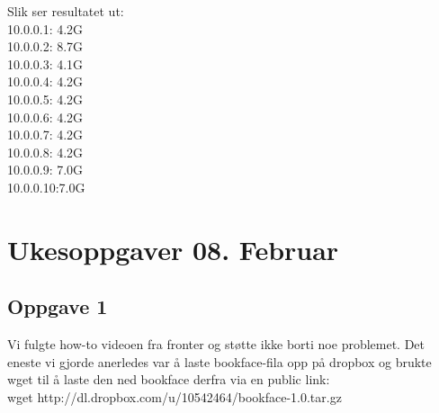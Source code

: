 \documentclass[a4paper, norsk, 12pt]{article}
\begin{document}
Slik ser resultatet ut:\\
10.0.0.1: 4.2G\\
10.0.0.2: 8.7G\\
10.0.0.3: 4.1G\\
10.0.0.4: 4.2G\\
10.0.0.5: 4.2G\\
10.0.0.6: 4.2G\\
10.0.0.7: 4.2G\\
10.0.0.8: 4.2G\\
10.0.0.9: 7.0G\\
10.0.0.10:7.0G

\section{Ukesoppgaver 08. Februar}

\subsection*{Oppgave 1}
Vi fulgte how-to videoen fra fronter og støtte ikke borti noe problemet. Det eneste vi gjorde anerledes var å laste bookface-fila opp på dropbox og brukte wget til å laste den ned bookface derfra via en public link:\\
 wget http://dl.dropbox.com/u/10542464/bookface-1.0.tar.gz


%

\end{document}
